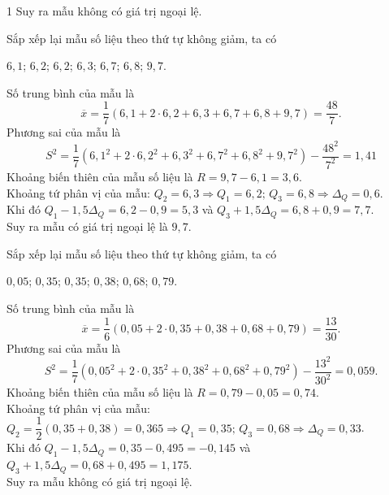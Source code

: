 \begin{bt}
{\begin{enumEX}[a)]{1}
			Suy ra mẫu không có giá trị ngoại lệ.
			\item Sắp xếp lại mẫu số liệu theo thứ tự không giảm, ta có 
			\begin{center}
				$6{,}1$; $6{,}2$; $6{,}2$; $6{,}3$; $6{,}7$; $6{,}8$; $9{,}7$.
			\end{center}
			Số trung bình của mẫu là $$\overline{x}=\dfrac{1}{7}\left(6{,}1+2\cdot 6{,}2+6{,}3+6{,}7+6{,}8+9{,}7\right)=\dfrac{48}{7}.$$
			Phương sai của mẫu là $$S^2=\dfrac{1}{7}\left(6{,}1^2+2\cdot 6{,}2^2+6{,}3^2+6{,}7^2+6{,}8^2+9{,}7^2\right)-\dfrac{48^2}{7^2}=1{,}41$$
			Khoảng biến thiên của mẫu số liệu là $R=9{,}7-6{,}1=3{,}6$.\\
			Khoảng tứ phân vị của mẫu:  $Q_2=6{,}3\Rightarrow Q_1=6{,}2;\, Q_3=6{,}8\Rightarrow \Delta_Q=0{,}6$.\\
			Khi đó $Q_1-1{,}5\Delta_Q=6{,}2-0{,}9=5{,}3$ và $Q_3+1{,}5\Delta_Q=6{,}8+0{,}9=7{,}7$.\\
			Suy ra mẫu có giá trị ngoại lệ là $9{,}7$.
			\item Sắp xếp lại mẫu số liệu theo thứ tự không giảm, ta có 
			\begin{center}
				$0{,}05$; $0{,}35$; $0{,}35$; $0{,}38$; $0{,}68$; $0{,}79$.
			\end{center}
			Số trung bình của mẫu là $$\overline{x}=\dfrac{1}{6}\left(0{,}05+2\cdot 0{,}35+0{,}38+0{,}68+0{,}79\right)=\dfrac{13}{30}.$$
			Phương sai của mẫu là $$S^2=\dfrac{1}{7}\left(0{,}05^2+2\cdot 0{,}35^2+0{,}38^2+0{,}68^2+0{,}79^2\right)-\dfrac{13^2}{30^2}=0{,}059.$$
			Khoảng biến thiên của mẫu số liệu là $R=0{,}79-0{,}05=0{,}74$.\\
			Khoảng tứ phân vị của mẫu:  $Q_2=\dfrac{1}{2}\left(0{,}35+0{,}38\right)=0{,}365\Rightarrow Q_1=0{,}35;\, Q_3=0{,}68\Rightarrow \Delta_Q=0{,}33$.\\
			Khi đó $Q_1-1{,}5\Delta_Q=0{,}35-0{,}495=-0{,}145$ và $Q_3+1{,}5\Delta_Q=0{,}68+0{,}495=1{,}175$.\\
			Suy ra mẫu không có giá trị ngoại lệ.
		\end{enumEX}
	}
\end{bt}

